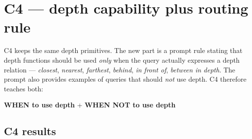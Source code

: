 \documentclass[11pt,a4paper]{article}
\begin{document}
\section{C4 --- depth capability plus routing rule}

\begin{center}
\end{center}

C4 keeps the same depth primitives. The new part is a prompt rule stating that depth
functions should be used \emph{only} when the query actually expresses a depth
relation --- \emph{closest}, \emph{nearest}, \emph{farthest}, \emph{behind},
\emph{in front of}, \emph{between in depth}. The prompt also provides examples of
queries that should \emph{not} use depth. C4 therefore teaches both:

\begin{center}
\textbf{WHEN to use depth} \quad + \quad \textbf{WHEN NOT to use depth}
\end{center}

\begin{center}
\end{center}

\subsection{C4 results}
\end{document}
